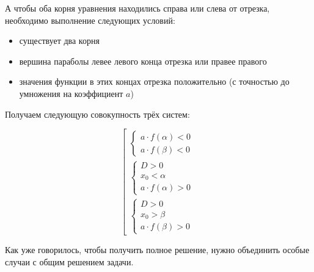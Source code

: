 А чтобы оба корня уравнения находились справа или слева от отрезка, необходимо выполнение следующих
условий:

\begin {itemize}
    \item {существует два корня}
    \item {вершина параболы левее левого конца отрезка или правее правого}
    \item {значения функции в этих концах отрезка положительно (с точностью до умножения на
           коэффициент $a$) }
\end {itemize}

Получаем следующую совокупность трёх систем:

\begin {equation*}
    \left[
        \begin {gathered}
            \begin {cases}
                a \cdot f(\alpha) < 0
                \\
                a \cdot f(\beta) < 0
            \end {cases}
            \\
            \begin {cases}
                D > 0
                \\
                x_0 < \alpha
                \\
                a \cdot f(\alpha) > 0
            \end {cases}
            \\
            \begin {cases}
                D > 0
                \\
                x_0 > \beta
                \\
                a \cdot f(\beta) > 0
            \end {cases}
        \end {gathered}
    \right.
\end {equation*}

Как уже говорилось, чтобы получить полное решение, нужно объединить особые случаи с общим решением
задачи.
